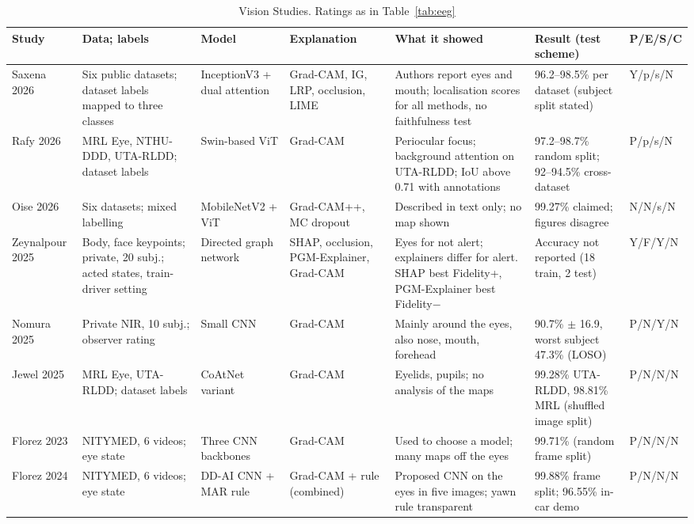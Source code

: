 \begin{table}[!t]
\centering
\caption{Vision Studies. Ratings as in Table~\ref{tab:eeg}}
\label{tab:vision}
\scriptsize
\setlength{\tabcolsep}{3pt}
\begin{tabularx}{\textwidth}{@{}L{1.6cm}L{2.8cm}L{2.3cm}L{2.1cm}YL{3cm}L{1.15cm}@{}}
\toprule
\textbf{Study} & \textbf{Data; labels} & \textbf{Model} & \textbf{Explanation} & \textbf{What it showed} & \textbf{Result (test scheme)} & \textbf{P/E/S/C} \\
\midrule
Saxena 2026 \cite{saxena2026lowlight} & Six public datasets; dataset labels mapped to three classes & InceptionV3 + dual attention & Grad-CAM, IG, LRP, occlusion, LIME & Authors report eyes and mouth; localisation scores for all methods, no faithfulness test & 96.2--98.5\% per dataset (subject split stated) & Y/p/s/N \\
Rafy 2026 \cite{rafy2026domain} & MRL Eye, NTHU-DDD, UTA-RLDD; dataset labels & Swin-based ViT & Grad-CAM & Periocular focus; background attention on UTA-RLDD; IoU above 0.71 with annotations & 97.2--98.7\% random split; 92--94.5\% cross-dataset & P/p/s/N \\
Oise 2026 \cite{oise2026enhancing} & Six datasets; mixed labelling & MobileNetV2 + ViT & Grad-CAM++, MC dropout & Described in text only; no map shown & 99.27\% claimed; figures disagree & N/N/s/N \\
Zeynalpour 2025 \cite{zeynalpour2025multimethod} & Body, face keypoints; private, 20 subj.; acted states, train-driver setting & Directed graph network & SHAP, occlusion, PGM-Explainer, Grad-CAM & Eyes for not alert; explainers differ for alert. SHAP best Fidelity+, PGM-Explainer best Fidelity$-$ & Accuracy not reported (18 train, 2 test) & Y/F/Y/N \\
Nomura 2025 \cite{nomura2025drowsiness} & Private NIR, 10 subj.; observer rating & Small CNN & Grad-CAM & Mainly around the eyes, also nose, mouth, forehead & 90.7\% $\pm$ 16.9, worst subject 47.3\% (LOSO) & P/N/Y/N \\
Jewel 2025 \cite{jewel2025lightweight} & MRL Eye, UTA-RLDD; dataset labels & CoAtNet variant & Grad-CAM & Eyelids, pupils; no analysis of the maps & 99.28\% UTA-RLDD, 98.81\% MRL (shuffled image split) & P/N/N/N \\
Florez 2023 \cite{florez2023cnn} & NITYMED, 6 videos; eye state & Three CNN backbones & Grad-CAM & Used to choose a model; many maps off the eyes & 99.71\% (random frame split) & P/N/N/N \\
Florez 2024 \cite{florez2024realtime} & NITYMED, 6 videos; eye state & DD-AI CNN + MAR rule & Grad-CAM + rule (combined) & Proposed CNN on the eyes in five images; yawn rule transparent & 99.88\% frame split; 96.55\% in-car demo & P/N/N/N \\

\end{tabularx}
\end{table}

